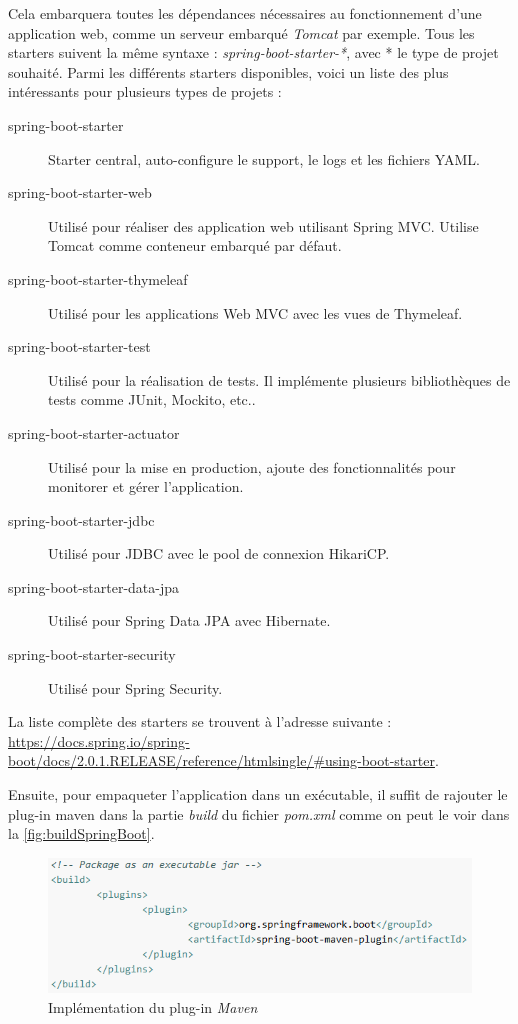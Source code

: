\documentclass{polytech/polytech}
\begin{document}
Cela embarquera toutes les dépendances nécessaires au fonctionnement d'une application web, comme un serveur embarqué \textit{Tomcat} par exemple. Tous les starters suivent la même syntaxe : \textit{spring-boot-starter-*}, avec * le type de projet souhaité. Parmi les différents starters disponibles, voici un liste des plus intéressants pour plusieurs types de projets :

\begin{description}
	\item[spring-boot-starter] Starter central, auto-configure le support, le logs et les fichiers YAML.
	\item[spring-boot-starter-web] Utilisé pour réaliser des application web utilisant Spring MVC. Utilise Tomcat comme conteneur embarqué par défaut.
	\item[spring-boot-starter-thymeleaf] Utilisé pour les applications Web MVC avec les vues de Thymeleaf.
	\item[spring-boot-starter-test] Utilisé pour la réalisation de tests. Il implémente plusieurs bibliothèques de tests comme JUnit, Mockito, etc..
	\item[spring-boot-starter-actuator] Utilisé pour la mise en production, ajoute des fonctionnalités pour monitorer et gérer l’application. 
	\item[spring-boot-starter-jdbc] Utilisé pour JDBC avec le pool de connexion HikariCP.
	\item[spring-boot-starter-data-jpa] Utilisé pour Spring Data JPA avec Hibernate.
	\item[spring-boot-starter-security] Utilisé pour Spring Security.
\end{description}

La liste complète des starters se trouvent à l’adresse suivante : \url{https://docs.spring.io/spring-boot/docs/2.0.1.RELEASE/reference/htmlsingle/#using-boot-starter}.

Ensuite, pour empaqueter l'application dans un exécutable, il suffit de rajouter le plug-in maven dans la partie \textit{build} du fichier \textit{pom.xml} comme on peut le voir dans la \autoref{fig:buildSpringBoot}.

\begin{figure}
	\includegraphics[scale=0.75]{images/buildSpringBoot}
	\caption{Implémentation du plug-in \textit{Maven}}
	\label{fig:buildSpringBoot}
\end{figure}
\end{document}
